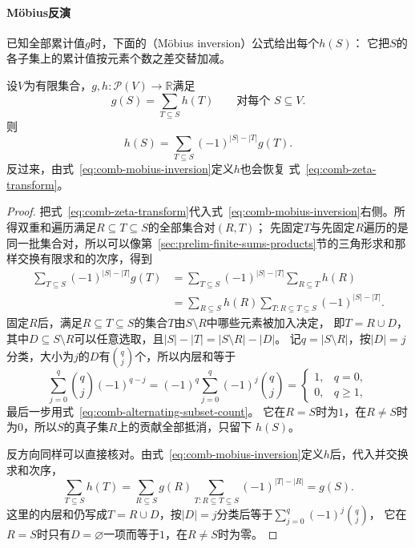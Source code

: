 \paragraph{Möbius反演}

已知全部累计值$g$时，下面的（Möbius inversion）公式给出每个$h(S)$：
它把$S$的各子集上的累计值按元素个数之差交替加减。
\begin{theorem}
\label{thm:comb-mobius-inversion}
设$V$为有限集合，$g,h:\mathcal{P}(V)\to\mathbb{R}$满足
\begin{equation}
  g(S)=\sum_{T\subseteq S}h(T)
  \qquad\text{对每个 }S\subseteq V.
  \label{eq:comb-zeta-transform}
\end{equation}
则
\begin{equation}
  h(S)
  =
  \sum_{T\subseteq S}(-1)^{|S|-|T|}g(T).
  \label{eq:comb-mobius-inversion}
\end{equation}
反过来，由式~\eqref{eq:comb-mobius-inversion}定义$h$也会恢复
式~\eqref{eq:comb-zeta-transform}。
\end{theorem}

\begin{proof}
把式~\eqref{eq:comb-zeta-transform}代入式~\eqref{eq:comb-mobius-inversion}右侧。所得双重和遍历满足$R\subseteq T\subseteq S$的全部集合对$(R,T)$；
先固定$T$与先固定$R$遍历的是同一批集合对，所以可以像第~\ref{sec:prelim-finite-sums-products}节的三角形求和那样交换有限求和的次序，得到
\begin{align*}
  \sum_{T\subseteq S}(-1)^{|S|-|T|}g(T)
  &=
  \sum_{T\subseteq S}(-1)^{|S|-|T|}
  \sum_{R\subseteq T}h(R)\\
  &=
  \sum_{R\subseteq S}h(R)
  \sum_{T:R\subseteq T\subseteq S}
  (-1)^{|S|-|T|}.
\end{align*}
固定$R$后，满足$R\subseteq T\subseteq S$的集合$T$由$S\setminus R$中哪些元素被加入决定，
即$T=R\cup D$，其中$D\subseteq S\setminus R$可以任意选取，且$|S|-|T|=|S\setminus R|-|D|$。
记$q=|S\setminus R|$，按$|D|=j$分类，大小为$j$的$D$有$\binom qj$个，所以内层和等于
\[
  \sum_{j=0}^{q}\binom{q}{j}(-1)^{q-j}
  =(-1)^q\sum_{j=0}^q(-1)^j\binom qj
  =\begin{cases}1,&q=0,\\0,&q\geq1,\end{cases}
\]
最后一步用式~\eqref{eq:comb-alternating-subset-count}。
它在$R=S$时为$1$，在$R\neq S$时为$0$，所以$S$的真子集$R$上的贡献全部抵消，只留下
$h(S)$。

反方向同样可以直接核对。由式~\eqref{eq:comb-mobius-inversion}定义$h$后，代入并交换求和次序，
\[
 \sum_{T\subseteq S}h(T)
 =\sum_{R\subseteq S}g(R)
   \sum_{T:R\subseteq T\subseteq S}(-1)^{|T|-|R|}
 =g(S).
\]
这里的内层和仍写成$T=R\cup D$，按$|D|=j$分类后等于$\sum_{j=0}^q(-1)^j\binom qj$，
它在$R=S$时只有$D=\varnothing$一项而等于$1$，在$R\neq S$时为零。
\end{proof}

